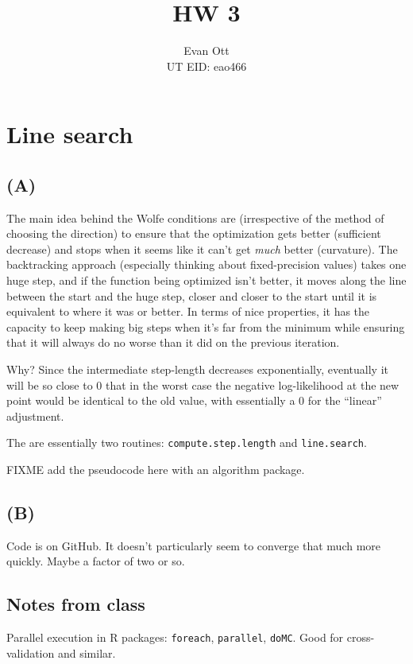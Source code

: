 \documentclass{article}
\title{\vspace{-6ex}HW 3\vspace{-2ex}}
\author{Evan Ott \\ UT EID: eao466\vspace{-2ex}}
\begin{document}
\maketitle
\section{Line search}
\subsection{(A)}
The main idea behind the Wolfe conditions are (irrespective of the method of choosing the direction) to ensure
that the optimization gets better (sufficient decrease) and stops when it seems like it can't get \emph{much} better
(curvature). The backtracking approach (especially thinking about fixed-precision values) takes one huge step, and if
the function being optimized isn't better, it moves along the line between the start and the huge step, closer and closer to the start until it is equivalent to where it was or better. In terms of nice properties, it has the capacity to keep making
big steps when it's far from the minimum while ensuring that it will always do no worse than it did on the previous iteration.

Why? Since the intermediate step-length decreases exponentially, eventually it will be so close to 0 that in the worst case
the negative log-likelihood at the new point would be identical to the old value, with essentially a 0 for the ``linear'' adjustment.

The are essentially two routines: \texttt{compute.step.length} and \texttt{line.search}.

\Large{FIXME} add the pseudocode here with an algorithm package.

\subsection{(B)}
Code is on GitHub. It doesn't particularly seem to converge that much more quickly. Maybe a factor of two or so.

\subsection{Notes from class}
Parallel execution in R packages: \texttt{foreach}, \texttt{parallel}, \texttt{doMC}. Good for cross-validation and similar.
\end{document}
